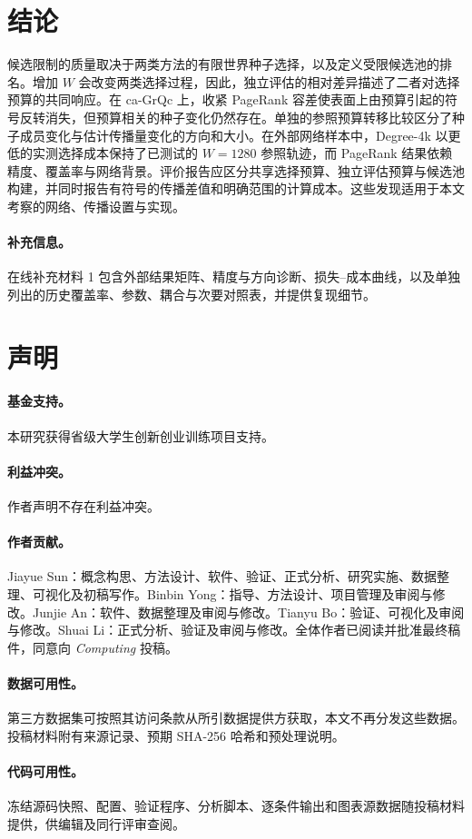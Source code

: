 \documentclass[smallextended]{svjour3}
\begin{document}
\section{结论}
候选限制的质量取决于两类方法的有限世界种子选择，以及定义受限候选池的排名。增加 $W$ 会改变两类选择过程，因此，独立评估的相对差异描述了二者对选择预算的共同响应。在 ca-GrQc 上，收紧 PageRank 容差使表面上由预算引起的符号反转消失，但预算相关的种子变化仍然存在。单独的参照预算转移比较区分了种子成员变化与估计传播量变化的方向和大小。在外部网络样本中，Degree-4k 以更低的实测选择成本保持了已测试的 $W=1280$ 参照轨迹，而 PageRank 结果依赖精度、覆盖率与网络背景。评价报告应区分共享选择预算、独立评估预算与候选池构建，并同时报告有符号的传播差值和明确范围的计算成本。这些发现适用于本文考察的网络、传播设置与实现。

\paragraph{补充信息。}在线补充材料 1 包含外部结果矩阵、精度与方向诊断、损失--成本曲线，以及单独列出的历史覆盖率、参数、耦合与次要对照表，并提供复现细节。
\section*{声明}
\paragraph{基金支持。}本研究获得省级大学生创新创业训练项目支持。
\paragraph{利益冲突。}作者声明不存在利益冲突。
\paragraph{作者贡献。}Jiayue Sun：概念构思、方法设计、软件、验证、正式分析、研究实施、数据整理、可视化及初稿写作。Binbin Yong：指导、方法设计、项目管理及审阅与修改。Junjie An：软件、数据整理及审阅与修改。Tianyu Bo：验证、可视化及审阅与修改。Shuai Li：正式分析、验证及审阅与修改。全体作者已阅读并批准最终稿件，同意向 \textit{Computing} 投稿。
\paragraph{数据可用性。}第三方数据集可按照其访问条款从所引数据提供方获取，本文不再分发这些数据。投稿材料附有来源记录、预期 SHA-256 哈希和预处理说明。
\paragraph{代码可用性。}冻结源码快照、配置、验证程序、分析脚本、逐条件输出和图表源数据随投稿材料提供，供编辑及同行评审查阅。

\end{document}
